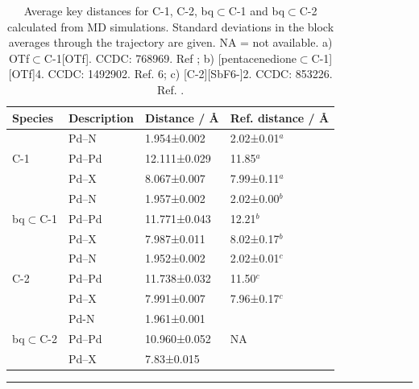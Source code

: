 \documentclass[../../main.tex]{subfiles}
\begin{document}
\begin{table}[h]
	\def\arraystretch{1.7}
	\begin{tabularx}{\textwidth}{YYYY}
		\hline		
		Species &	Description	&Distance / \AA&	Ref. distance / \AA \\
		\hline
		
			  & Pd–N&	1.954±0.002	&2.02±0.01$^a$
\\
		 C-1 &        	Pd–Pd&	12.111±0.029&	11.85$^a$
\\
			&	Pd–X	&8.067±0.007	&7.99±0.11$^a
$\\
						&	Pd–N&	1.957±0.002	&2.02±0.00$^b$
\\
		bq$\subset$C-1	&	Pd–Pd	&11.771±0.043&	12.21$^b$
\\
			&	Pd–X&	7.987±0.011	&8.02±0.17$^b$
\\
		&Pd–N&	1.952±0.002	&2.02±0.01$^c$
\\
			C-2		&Pd–Pd	&11.738±0.032	&11.50$^c
$\\
				&Pd–X	&7.991±0.007&	7.96±0.17$^c$
\\
			&Pd-N&	1.961±0.001	
&\\
			bq$\subset$C-2	&Pd–Pd	&10.960±0.052&	NA
\\
				&Pd–X&	7.83±0.015	&
\\
	
	\end{tabularx}
	\hrule
	\vspace{0.2cm}
	\caption{Average key distances for C-1, C-2, bq$\subset$C-1 and bq$\subset$C-2 calculated from MD simulations. Standard deviations in the block averages through the trajectory are given. NA = not available. a) OTf$\subset$C-1[OTf]. CCDC: 768969. Ref \cite{Liao2010}; b) [pentacenedione$\subset$C-1][OTf]4. CCDC: 1492902. Ref. 6; c) [C-2][SbF6-]2. CCDC: 853226. Ref. \cite{Lewis2012}.}
	\label{table::si_da_2}
\end{table}
\end{document}
